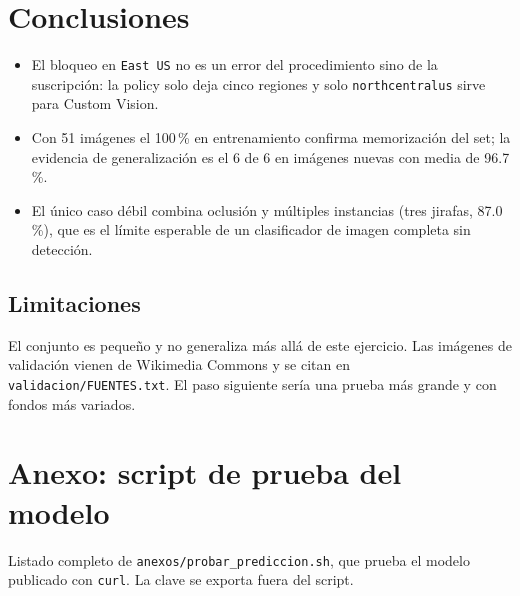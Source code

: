 \documentclass[a4paper,11pt]{article}
\begin{document}
  \section{Conclusiones}
  \begin{itemize}
    \item El bloqueo en \texttt{East US} no es un error del procedimiento sino
      de la suscripci\'on: la policy solo deja cinco regiones y solo
      \texttt{northcentralus} sirve para Custom Vision.
    \item Con 51 im\'agenes el 100\,\% en entrenamiento confirma
      memorizaci\'on del set; la evidencia de generalizaci\'on es el 6 de 6 en
      im\'agenes nuevas con media de 96.7\,\%.
    \item El \'unico caso d\'ebil combina oclusi\'on y m\'ultiples instancias
      (tres jirafas, 87.0\,\%), que es el l\'imite esperable de un
      clasificador de imagen completa sin detecci\'on.
  \end{itemize}

  \subsection{Limitaciones}
  El conjunto es peque\~no y no generaliza m\'as all\'a de este ejercicio. Las
  im\'agenes de validaci\'on vienen de Wikimedia Commons y se citan en
  \texttt{validacion/FUENTES.txt}. El paso siguiente ser\'ia una prueba m\'as
  grande y con fondos m\'as variados.

  
  

  \appendix
  \section{Anexo: script de prueba del modelo}
  Listado completo de \texttt{anexos/probar\_prediccion.sh}, que prueba el
  modelo publicado con \texttt{curl}. La clave se exporta fuera del script.

  
\end{document}
